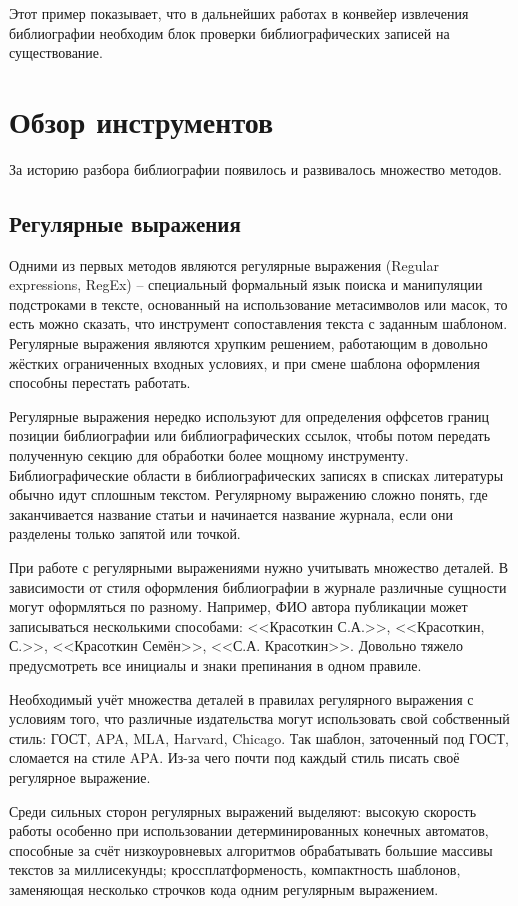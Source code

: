 Этот пример показывает, что в дальнейших работах в конвейер извлечения библиографии необходим блок проверки библиографических записей на существование.

\section{Обзор инструментов}
За историю разбора библиографии появилось и развивалось множество методов.

\subsection{Регулярные выражения}
Одними из первых методов являются регулярные выражения (Regular expressions, RegEx) -- специальный формальный язык поиска и манипуляции подстроками в тексте, основанный на использование метасимволов или масок, то есть можно сказать, что инструмент сопоставления текста с заданным шаблоном. Регулярные выражения являются хрупким решением, работающим в довольно жёстких ограниченных входных условиях, и при смене шаблона оформления способны перестать работать\cite{davis2019rethinking}.

Регулярные выражения нередко используют для определения оффсетов границ позиции библиографии или библиографических ссылок, чтобы потом передать полученную секцию для обработки более мощному инструменту. Библиографические области в библиографических записях в списках литературы обычно идут сплошным текстом. Регулярному выражению сложно понять, где заканчивается название статьи и начинается название журнала, если они разделены только запятой или точкой. 

При работе с регулярными выражениями нужно учитывать множество деталей. В зависимости от стиля оформления библиографии в журнале различные сущности могут оформляться по разному. Например, ФИО автора публикации может записываться несколькими способами: <<Красоткин С.А.>>, <<Красоткин, С.>>, <<Красоткин Семён>>, <<С.А. Красоткин>>. Довольно тяжело предусмотреть все инициалы и знаки препинания в одном правиле.

Необходимый учёт множества деталей в правилах регулярного выражения с условиям того, что различные издательства могут использовать свой собственный стиль: ГОСТ, APA, MLA, Harvard, Chicago. Так шаблон, заточенный под ГОСТ, сломается на стиле APA. Из-за чего почти под каждый стиль писать своё регулярное выражение.

Среди сильных сторон регулярных выражений выделяют: высокую скорость работы особенно при использовании детерминированных конечных автоматов, способные за счёт низкоуровневых алгоритмов обрабатывать большие массивы текстов за миллисекунды; кроссплатформеность, компактность шаблонов, заменяющая несколько строчков кода одним регулярным выражением. 

